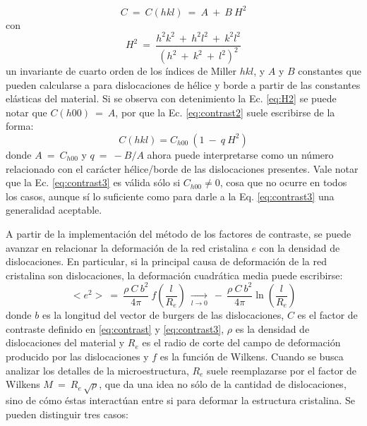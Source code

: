 \begin{equation}
  C \ = \ C(hkl) \ = \ A \ + \ B \ H^2
  \label{eq:contrast2}
\end{equation}
\noindent
con
\begin{equation}
  H^2 \ = \ \frac{h^2k^2 \ + \ h^2l^2 \ + \ k^2l^2}{(h^2 \ + \ k^2 \ + \ l^2)^2}
  \label{eq:H2}
\end{equation}
\noindent
un invariante de cuarto orden de los índices de Miller $hkl$, y $A$ y $B$ constantes que pueden calcularse a para dislocaciones de hélice y borde a partir de las constantes elásticas del material.
Si se observa con detenimiento la Ec. \ref{eq:H2} se puede notar que $C(h00) \ = \ A$, por que la Ec. \ref{eq:contrast2} suele escribirse de la forma:
\begin{equation}
  C(hkl) = C_{h00}\ (1 \ - \ q\ H^2)
  \label{eq:contrast3}
\end{equation}
\noindent
donde $A \ = \ C_{h00}$ y $q \ = \ -B/A$ ahora puede interpretarse como un número relacionado con el carácter hélice/borde de las dislocaciones presentes.
Vale notar que la Ec. \ref{eq:contrast3} es válida sólo si $C_{h00} \neq 0$, cosa que no ocurre en todos los casos, aunque sí lo suficiente como para darle a la Eq. \ref{eq:contrast3} una generalidad aceptable.

A partir de la implementación del método de los factores de contraste, se puede avanzar en relacionar la deformación de la red cristalina $e$ con la densidad de dislocaciones. En particular, si la principal causa de deformación de la red cristalina son dislocaciones, la deformación cuadrática media puede escribirse\cite{Wilkens1970}:
\begin{equation}
  <e^2> \ = \ \frac{\rho \ C \ b^2}{4 \pi} \ f\left(\frac{l}{R_e}\right) \ \xrightarrow[l \to 0]{} \ - \ \frac{\rho \ C \ b^2}{4 \pi} \ln \left(\frac{l}{R_e}\right)
  \label{eq:Wilkens}
\end{equation}
\noindent
donde $b$ es la longitud del vector de burgers de las dislocaciones, $C$ es el factor de contraste definido en \ref{eq:contrast} y \ref{eq:contrast3}, $\rho$ es la densidad de dislocaciones del material y $R_e$ es el radio de corte del campo de deformación producido por las dislocaciones y $f$ es la función de Wilkens. 
Cuando se busca analizar los detalles de la microestructura, $R_e$ suele reemplazarse por el factor de Wilkens $M \ = \ R_e\,\sqrt{\rho}$, que da una idea no sólo de la cantidad de dislocaciones, sino de cómo éstas interactúan entre si para deformar la estructura cristalina. Se pueden distinguir tres casos:

